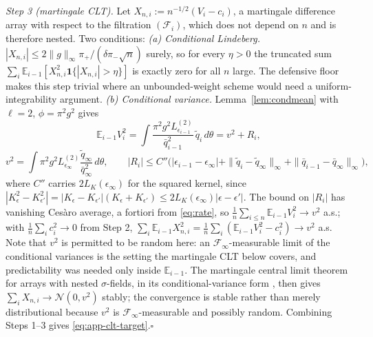 \documentclass[pdflatex,sn-mathphys-num]{sn-jnl}
\theoremstyle{plain}
\theoremstyle{definition}
\begin{document}
\begin{appendices}
\emph{Step 3 (martingale CLT).} Let $X_{n,i}:=n^{-1/2}(V_i-c_i)$, a martingale difference array with respect to the filtration $(\mathcal{F}_i)$, which does not depend on $n$ and is therefore nested. Two conditions:
\emph{(a) Conditional Lindeberg.} $|X_{n,i}|\le2\|g\|_\infty\pi_+/(\delta\pi_-\sqrt n)$ surely, so for every $\eta>0$ the truncated sum $\sum_i\mathbb{E}_{i-1}[X^2_{n,i}\mathbf{1}\{|X_{n,i}|>\eta\}]$ is exactly zero for all $n$ large. The defensive floor makes this step trivial where an unbounded-weight scheme would need a uniform-integrability argument.
\emph{(b) Conditional variance.} Lemma~\ref{lem:condmean} with $\ell=2$, $\phi=\pi^2g^2$ gives
\[
\mathbb{E}_{i-1}V_i^2=\int\frac{\pi^2g^2L^{(2)}_{\epsilon_{i-1}}}{\bar q^2_{i-1}}\,\tilde q_i\,d\theta
=v^2+R_i,
\]
\[
v^2=\int\pi^2g^2L^{(2)}_{\epsilon_\infty}\frac{\tilde q_\infty}{\bar q^2_\infty}\,d\theta,
\qquad
|R_i|\le C''\bigl(|\epsilon_{i-1}-\epsilon_\infty|+\|\tilde q_i-\tilde q_\infty\|_\infty+\|\bar q_{i-1}-\bar q_\infty\|_\infty\bigr),
\]
where $C''$ carries $2L_K(\epsilon_\infty)$ for the squared kernel, since $|K^2_\epsilon-K^2_{\epsilon'}|=|K_\epsilon-K_{\epsilon'}|(K_\epsilon+K_{\epsilon'})\le2L_K(\epsilon_\infty)|\epsilon-\epsilon'|$. The bound on $|R_i|$ has vanishing Ces\`aro average, a fortiori from \eqref{eq:rate}, so $\tfrac1n\sum_{i\le n}\mathbb{E}_{i-1}V^2_i\to v^2$ a.s.; with $\tfrac1n\sum_ic^2_i\to0$ from Step 2,
$\sum_i\mathbb{E}_{i-1}X^2_{n,i}=\tfrac1n\sum_i(\mathbb{E}_{i-1}V^2_i-c^2_i)\to v^2$ a.s. Note that $v^2$ is permitted to be random here: an $\mathcal{F}_\infty$-measurable limit of the conditional variances is the setting the martingale CLT below covers, and predictability was needed only inside $\mathbb{E}_{i-1}$.
The martingale central limit theorem for arrays with nested $\sigma$-fields, in its conditional-variance form \cite[Cor.~3.1, pp.~58--59]{hall1980martingale}, then gives $\sum_iX_{n,i}\to\mathcal{N}(0,v^2)$ stably; the convergence is stable rather than merely distributional because $v^2$ is $\mathcal{F}_\infty$-measurable and possibly random. Combining Steps 1--3 gives \eqref{eq:app-clt-target}.\hfill$\square$


\end{appendices}
\end{document}
